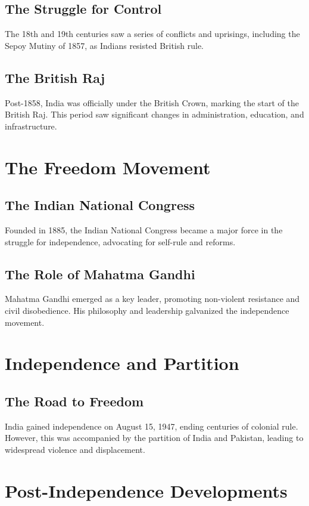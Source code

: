\documentclass{book}
\begin{document}
\subsection{The Struggle for Control}
The 18th and 19th centuries saw a series of conflicts and uprisings, including the Sepoy Mutiny of 1857, as Indians resisted British rule.

\subsection{The British Raj}
Post-1858, India was officially under the British Crown, marking the start of the British Raj. This period saw significant changes in administration, education, and infrastructure.

\section{The Freedom Movement}
\label{sec:freedom-movement}

\subsection{The Indian National Congress}
Founded in 1885, the Indian National Congress became a major force in the struggle for independence, advocating for self-rule and reforms.

\subsection{The Role of Mahatma Gandhi}
Mahatma Gandhi emerged as a key leader, promoting non-violent resistance and civil disobedience. His philosophy and leadership galvanized the independence movement.

\section{Independence and Partition}
\label{sec:independence-partition}

\subsection{The Road to Freedom}
India gained independence on August 15, 1947, ending centuries of colonial rule. However, this was accompanied by the partition of India and Pakistan, leading to widespread violence and displacement.

\section{Post-Independence Developments}
\label{sec:post-independence-developments}
\end{document}
